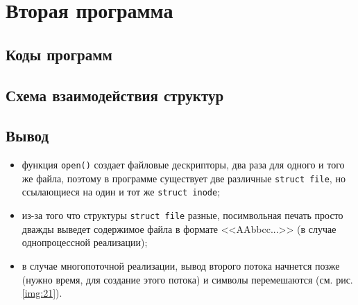 \section{Вторая программа}

\subsection{Коды программ}



\clearpage



\clearpage

\subsection{Схема взаимодействия структур}


\subsection*{Вывод}

\begin{itemize}
	\item функция \texttt{open()} создает файловые дескрипторы, два раза для одного и того же файла, поэтому в программе существует две различные \texttt{struct file}, но ссылающиеся на один и тот же \texttt{struct inode};
	\item из-за того что структуры \texttt{struct file} разные, посимвольная печать просто дважды выведет содержимое файла в формате <<AAbbcc...>> (в случае однопроцессной реализации); 
	\item в случае многопоточной реализации, вывод второго потока начнется позже (нужно время, для создание этого потока) и символы перемешаются (см. рис. \ref{img:21}).
\end{itemize}

\clearpage

